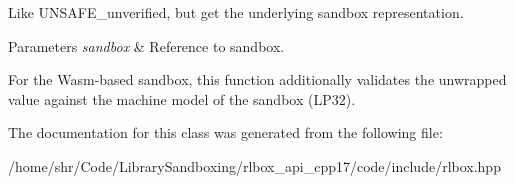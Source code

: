 Like U\+N\+S\+A\+F\+E\+\_\+unverified, but get the underlying sandbox representation. 


\begin{DoxyParams}{Parameters}
{\em sandbox} & Reference to sandbox.\\
\hline
\end{DoxyParams}
For the Wasm-\/based sandbox, this function additionally validates the unwrapped value against the machine model of the sandbox (L\+P32). 

The documentation for this class was generated from the following file\+:\begin{DoxyCompactItemize}
\item 
/home/shr/\+Code/\+Library\+Sandboxing/rlbox\+\_\+api\+\_\+cpp17/code/include/rlbox.\+hpp\end{DoxyCompactItemize}
